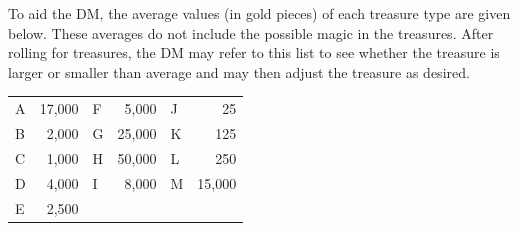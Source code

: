 \documentclass[letterpaper,serif,tightsqueeze]{module}
\begin{document}
To aid the DM, the average values (in gold pieces) of each treasure
type are given below. These averages do not include the possible
magic in the treasures. After rolling for treasures, the DM may refer
to this list to see whether the treasure is larger or smaller than
average and may then adjust the treasure as desired.

\begin{tabular}{>{\hfill}p{1cm} r >{\hfill}p{1cm} r >{\hfill}p{1cm} r}
A & 17,000 & F &  5,000 & J &     25\\
B &  2,000 & G & 25,000 & K &    125\\
C &  1,000 & H & 50,000 & L &    250\\
D &  4,000 & I &  8,000 & M & 15,000\\
E &  2,500\\
\end{tabular}
\end{document}
